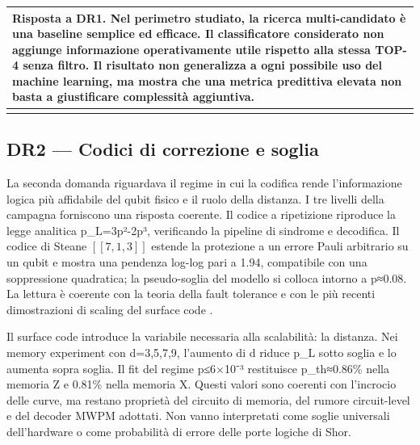 {\def\LTcaptype{none} %
\begin{longtable}[]{@{}
  >{\raggedright\arraybackslash}p{}@{}}
\toprule\noalign{}
\begin{minipage}[b]{\linewidth}\raggedright
\textbf{Risposta a DR1.} Nel perimetro studiato, la ricerca multi-candidato è una baseline semplice ed efficace. Il classificatore considerato non aggiunge informazione operativamente utile rispetto alla stessa TOP-4 senza filtro. Il risultato non generalizza a ogni possibile uso del machine learning, ma mostra che una metrica predittiva elevata non basta a giustificare complessità aggiuntiva.
\end{minipage} \\
\midrule\noalign{}
\endhead
\bottomrule\noalign{}
\endlastfoot
\end{longtable}
}

\subsection{DR2 --- Codici di correzione e soglia}\label{sec:finale_6_1_2}

La seconda domanda riguardava il regime in cui la codifica rende l'informazione logica più affidabile del qubit fisico e il ruolo della distanza. I tre livelli della campagna forniscono una risposta coerente. Il codice a ripetizione riproduce la legge analitica p\_L=3p²-2p³, verificando la pipeline di sindrome e decodifica. Il codice di Steane \ensuremath{[[7,1,3]]} estende la protezione a un errore Pauli arbitrario su un qubit e mostra una pendenza log-log pari a 1.94, compatibile con una soppressione quadratica; la pseudo-soglia del modello si colloca intorno a p≈0.08. La lettura è coerente con la teoria della fault tolerance e con le più recenti dimostrazioni di scaling del surface code \cite{steane1996,fowler2012,googleQECBelowThreshold2025,googleSurfaceCode2023,aharonov1997fault,dennis2002topological,calderbankShor1996,gottesman1997}.

Il surface code introduce la variabile necessaria alla scalabilità: la distanza. Nei memory experiment con d=3,5,7,9, l'aumento di d riduce p\_L sotto soglia e lo aumenta sopra soglia. Il fit del regime p≤6×10⁻³ restituisce p\_th≈0.86\% nella memoria Z e 0.81\% nella memoria X. Questi valori sono coerenti con l'incrocio delle curve, ma restano proprietà del circuito di memoria, del rumore circuit-level e del decoder MWPM adottati. Non vanno interpretati come soglie universali dell'hardware o come probabilità di errore delle porte logiche di Shor.

